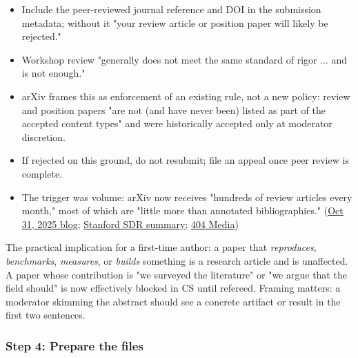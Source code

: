 \documentclass[twocolumn,10pt,letterpaper]{article}
\begin{document}
\begin{itemize}
\setlength{\itemsep}{0pt}
\setlength{\parskip}{0pt}
  \item Include the peer-reviewed journal reference and DOI in the submission metadata; without it "your review article or position paper will likely be rejected."
  \item Workshop review "generally does not meet the same standard of rigor ... and is not enough."
  \item arXiv frames this as enforcement of an existing rule, not a new policy: review and position papers "are not (and have never been) listed as part of the accepted content types" and were historically accepted only at moderator discretion.
  \item If rejected on this ground, do not resubmit; file an appeal once peer review is complete.
  \item The trigger was volume: arXiv now receives "hundreds of review articles every month," most of which are "little more than annotated bibliographies." (\href{https://blog.arxiv.org/2025/10/31/attention-authors-updated-practice-for-review-articles-and-position-papers-in-arxiv-cs-category/}{Oct 31, 2025 blog}; \href{https://sdr.library.stanford.edu/news/arxiv-policy-change-impacts-computer-science-authors}{Stanford SDR summary}; \href{https://www.404media.co/arxiv-changes-rules-after-getting-spammed-with-ai-generated-research-papers/}{404 Media})
\end{itemize}

The practical implication for a first-time author: a paper that \textit{reproduces}, \textit{benchmarks}, \textit{measures}, or \textit{builds} something is a research article and is unaffected. A paper whose contribution is "we surveyed the literature" or "we argue that the field should" is now effectively blocked in CS until refereed. Framing matters: a moderator skimming the abstract should see a concrete artifact or result in the first two sentences.


\subsubsection{Step 4: Prepare the files}
\end{document}
